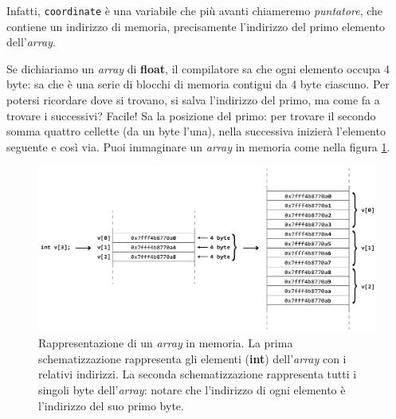 	Infatti, \verb|coordinate| è una variabile che più avanti chiameremo \emph{puntatore}, che contiene un indirizzo di memoria, precisamente l'indirizzo del primo elemento dell'\emph{array}. 
	
	Se dichiariamo un \emph{array} di \textbf{float}, il compilatore sa che ogni elemento occupa 4 byte: sa che è una serie di blocchi di memoria contigui da 4 byte ciascuno. Per potersi ricordare dove si trovano, si salva l'indirizzo del primo, ma come fa a trovare i successivi? Facile! Sa la posizione del primo: per trovare il secondo somma quattro cellette (da un byte l'una), nella successiva inizierà l'elemento seguente e così via. 
	Puoi immaginare un \emph{array} in memoria come nella figura \ref{memory2}.
\begin{figure} [ht]
	\centering
	\includegraphics[scale=0.35]{Immagini/array_mem.pdf}  
	\captionsetup{margin=1.5cm} %
	\caption{Rappresentazione di un \emph{array} in memoria. La prima schematizzazione rappresenta gli elementi (\textbf{int}) dell'\emph{array} con i relativi indirizzi. La seconda schematizzazione rappresenta tutti i singoli byte dell'\emph{array}: notare che l'indirizzo di ogni elemento è l'indirizzo del suo primo byte.\protect\footnotemark}
	\label{memory2}
\end{figure}



